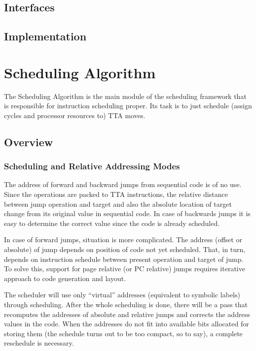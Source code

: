 \documentclass[a4paper,twoside]{tce}
\begin{document}
\section{Interfaces}
\section{Implementation}



\chapter{Scheduling Algorithm}

The Scheduling Algorithm is the main module of the scheduling framework that
is responsible for instruction scheduling proper. Its task is to just
schedule (assign cycles and processor resources to) TTA moves.

\section{Overview}

\subsection{Scheduling and Relative Addressing Modes}

The address of forward and backward jumps from sequential code is of no use.
Since the operations are packed to TTA instructions, the relative distance
between jump operation and target and also the absolute location of target
change from its original value in sequential code. In case of backwards
jumps it is easy to determine the correct value since the code is already
scheduled.

In case of forward jumps, situation is more complicated. The address (offset
or absolute) of jump depends on position of code not yet scheduled. That, in
turn, depends on instruction schedule between present operation and target
of jump.
%
To solve this, support for page relative (or PC relative) jumps requires
iterative approach to code generation and layout.

The scheduler will use only ``virtual'' addresses (equivalent to symbolic
labels) through scheduling.  After the whole scheduling is done, there will
be a pass that recomputes the addresses of absolute and relative jumps and
corrects the address values in the code. When the addresses do not fit into
available bits allocated for storing them (the schedule turns out to be too
compact, so to say), a complete reschedule is necessary.
\end{document}

